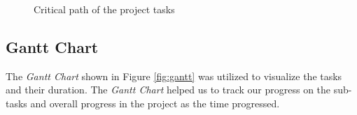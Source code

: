 \documentclass[compsoc]{IEEEtran}
\begin{document}
\begin{figure}[ht]
{
    }
    \caption{Critical path of the project tasks}
    \label{fig:critical_path}
\end{figure}





\newpage
\subsection{Gantt Chart}
The \emph{Gantt Chart} shown in Figure \ref{fig:gantt} was utilized to visualize the tasks and their duration. The \emph{Gantt Chart} helped us to track our progress on the sub-tasks and overall progress in the project as the time progressed.

\vspace{5mm}

\end{document}
